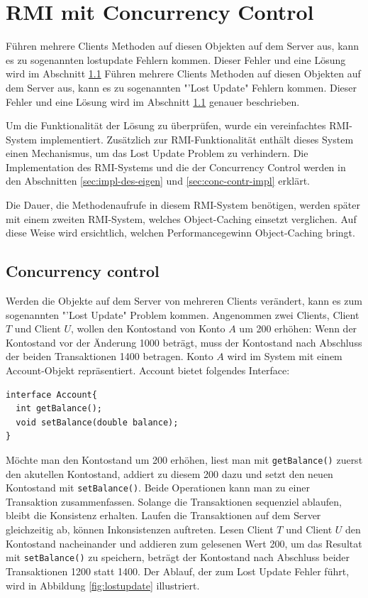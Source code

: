 \chapter{RMI mit Concurrency Control}


Führen mehrere Clients Methoden auf diesen Objekten auf dem Server aus,
kann es zu sogenannten \gls{lostupdate} Fehlern kommen. Dieser Fehler  und eine Lösung wird im Abschnitt \ref{sec:concurrency-control}
Führen mehrere Clients Methoden auf diesen Objekten auf dem Server aus,
kann es zu sogenannten "'Lost Update" Fehlern kommen. Dieser Fehler und eine Lösung wird im Abschnitt \ref{sec:concurrency-control}
genauer beschrieben. 

Um die Funktionalität der Lösung zu überprüfen, wurde ein
vereinfachtes RMI-System implementiert. Zusätzlich zur
RMI-Funktionalität ent\-hält dies\-es System einen Mechanismus, um das Lost
Update Problem zu verhindern. Die Implementation des RMI-Systems und
die der Concurrency Control werden in den Abschnitten
\ref{sec:impl-des-eigen} und \ref{sec:conc-contr-impl} erklärt.

Die Dauer, die Methodenaufrufe in diesem RMI-System benötigen, werden
später mit einem zweiten RMI-System, welches Object-Caching einsetzt
verglichen. Auf diese Weise wird ersichtlich, welchen
Performancegewinn Object-Caching bringt.


\section{Concurrency control}
\label{sec:concurrency-control}
Werden die Objekte auf dem Server von mehreren Clients verändert, kann
es zum sogenannten "'Lost Update" Problem kommen. Angenommen zwei
Clients, Client $T$ und Client $U$, wollen den Kontostand von Konto
$A$ um 200 erhöhen: Wenn der Kontostand vor der Änderung 1000 beträgt,
muss der Kontostand nach Abschluss der beiden Transaktionen 1400
betragen. Konto $A$ wird im System mit einem Account-Objekt
repräsentiert. Account bietet folgendes Interface:

\lstset{language=Java}
\begin{lstlisting}
interface Account{
  int getBalance();
  void setBalance(double balance);
}
\end{lstlisting}

Möchte man den Kontostand um 200 erhöhen, liest man mit \newline
\verb|getBalance()| zuerst den akutellen Kontostand, addiert zu
diesem 200 dazu und setzt den neuen Kontostand mit
\verb|setBalance()|. Beide Operationen kann man zu einer Transaktion
zusammenfassen. Solange die Transaktionen sequenziel ablaufen, bleibt die
Konsistenz erhalten. Laufen die Transaktionen auf dem Server
gleichzeitig ab, können Inkonsistenzen auftreten. Lesen Client $T$ und
Client $U$ den Kontostand nacheinander und addieren zum gelesenen Wert
200, um das Resultat mit \verb|setBalance()| zu speichern, beträgt der
Kontostand nach Abschluss beider Transaktionen 1200 statt 1400. Der
Ablauf, der zum Lost Update Fehler führt, wird in Abbildung
\ref{fig:lostupdate} illustriert.

